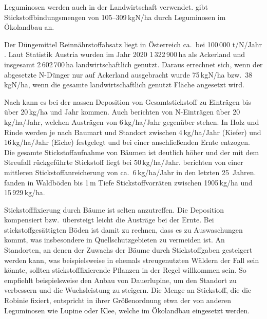 \documentclass[twocolumn]{scrartcl}
\begin{document}
Leguminosen werden auch in der Landwirtschaft verwendet.
\citet{kolbe2008stickstoff} gibt Stickstoffbindungsmengen von
105--309\,kgN/ha durch Leguminosen im Ökolandbau an.

Der Düngemittel Reinnährstoffabsatz liegt in Österreich ca.\ bei 100\,000
t/N/Jahr \citep{ama2024duengemittel}. Laut Statistik Austria wurden im Jahr 2020
1\,322\,900\,ha als Ackerland und insgesamt 2\,602\,700\,ha landwirtschaftlich
genutzt. Daraus errechnet sich, wenn der abgesetzte N-Dünger nur auf Ackerland
ausgebracht wurde 75\,kgN/ha bzw.\ 38\,kgN/ha, wenn die gesamte
landwirtschaftlich genutzt Fläche angesetzt wird.

Nach \citet{uba1998deposition} kann es bei der nassen Deposition von
Gesamtstickstoff zu Einträgen bis über 20\,kg/ha und Jahr kommen. Auch
\citet{raspe2018stickstoff} berichten von N-Einträgen über
20\,kg/ha/Jahr, welchen Austrägen von 6\,kg/ha/Jahr gegenüber
stehen. In Holz und Rinde werden je nach Baumart und Standort zwischen
4\,kg/ha/Jahr (Kiefer) und 16\,kg/ha/Jahr (Eiche) festgelegt und bei
einer anschließenden Ernte entzogen. Die gesamte Stickstoffaufnahme
von Bäumen ist deutlich höher und der mit dem Streufall rückgeführte
Stickstoff liegt bei 50\,kg/ha/Jahr. \citet{raspe2018stickstoff}
berichten von einer mittleren Stickstoffanreicherung von
ca.\ 6\,kg/ha/Jahr in den letzten 25~Jahren.
\citet{emberger1965stickstoff} fanden in Waldböden bis 1\,m Tiefe
Stickstoffvorräten zwischen 1905\,kg/ha und 15\,929\,kg/ha.

Stickstofffixierung durch Bäume ist selten anzutreffen.
Die Deposition kompensiert bzw.\ übersteigt leicht die Austräge bei
der Ernte. Bei stickstoffgesättigten Böden ist damit zu rechnen, dass
es zu Auswaschungen kommt, was insbesondere in Quellschutzgebieten zu
vermeiden ist. An Standorten, an denen der Zuwachs der Bäume durch
Stickstoffgaben gesteigert werden kann, was beispielsweise in ehemals
streugenutzten Wäldern der Fall sein könnte, sollten
stickstofffixierende Pflanzen in der Regel willkommen sein. So
empfiehlt beispielsweise \citet{wiedemann1951ertragskunde} den Anbau
von Dauerlupine, um den Standort zu verbessern und die Wuchsleistung zu
steigern. Die Menge an Stickstoff, die die Robinie fixiert, entspricht
in ihrer Größenordnung etwa der von anderen Leguminosen wie Lupine
oder Klee, welche im Ökolandbau eingesetzt werden.
\end{document}
